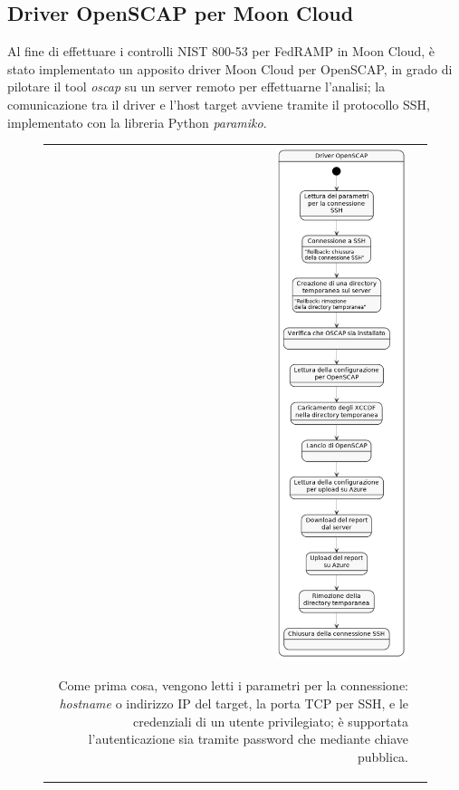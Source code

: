 \documentclass[../main.tex]{subfiles}
\begin{document}
\subsection{Driver OpenSCAP per Moon Cloud}
\label{sec:openscapmooncloud}
Al fine di effettuare i controlli NIST 800-53 per FedRAMP in Moon Cloud, è stato implementato un apposito driver Moon Cloud per OpenSCAP, in grado di pilotare il tool \textit{oscap} su un server remoto per effettuarne l'analisi; la comunicazione tra il driver e l'host target avviene tramite il protocollo SSH, implementato con la libreria Python \textit{paramiko}.


\begin{figure}[H]
\begin{tabular}{rl} 
\begin{minipage}{0.4\textwidth} 
\centering
\includegraphics[height=15cm]{immagini/DRIVER_OPENSCAP.png}

\end{minipage} 

\begin{minipage}{0.54\textwidth} 
Come prima cosa, vengono  letti i parametri per la connessione: \textit{hostname} o indirizzo IP del target, la porta TCP per SSH, e le credenziali di un utente privilegiato; è supportata l'autenticazione sia tramite password che mediante chiave pubblica.


\end{minipage}
\end{tabular}
\end{figure}
\end{document}
